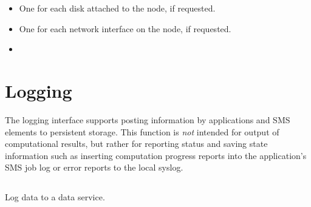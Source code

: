 \begin{itemize}
{    files which have been mmapped, such as libraries. Note that some kernel configurations might consider all pages part of a larger allocation (e.g., THP) as “mapped”, as soon as a single page is mapped. In MBytes
    }
    \item {} One for each disk attached to the node, if requested.
    \item {} One for each network interface on the node, if requested.
    \item {}
\end{itemize}


\section{Logging}
\label{chap:api_job_mgmt:logging}

The logging interface supports posting information by applications and SMS elements to persistent storage. This function is \textit{not} intended for output of computational results, but rather for reporting status and saving state information such as inserting computation progress reports into the application's \ac{SMS} job log or error reports to the local syslog.

\subsection{}

\summary

Log data to a data service.

\format


\begin{arglist}
\end{arglist}

